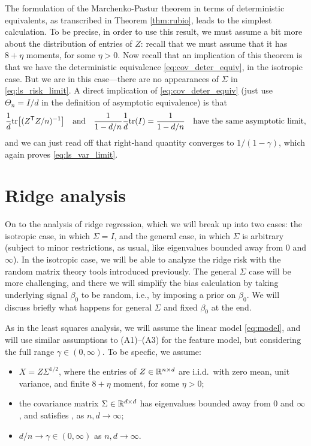 \documentclass{article}
\begin{document}
The formulation of the Marchenko-Pastur theorem in terms of deterministic
equivalents, as transcribed in Theorem \ref{thm:rubio}, leads to the simplest
calculation. To be precise, in order to use this result, we must assume a bit
more about the distribution of entries of $Z$: recall that we must assume that
it has $8+\eta$ moments, for some $\eta>0$. Now recall that an implication of
this theorem is that we have the deterministic equivalence
\eqref{eq:cov_deter_equiv}, in the isotropic case. But we are in this
case---there are no appearances of $\Sigma$ in \eqref{eq:ls_risk_limit}.  A 
direct implication of \eqref{eq:cov_deter_equiv} (just use $\Theta_n = I/d$ in
the definition of asymptotic equivalence) is that   
\[
\frac{1}{d} \mathrm{tr} \big[ (Z^{\mathsf{T}} Z/n)^{-1} \big] \quad \text{and} \quad
\frac{1}{1-d/n} \frac{1}{d} \mathrm{tr}(I) = \frac{1}{1-d/n} \quad \text{have the same 
  asymptotic limit}, 
\]
and we can just read off that right-hand quantity converges to $1/(1-\gamma)$,
which again proves \eqref{eq:ls_var_limit}.   

\section{Ridge analysis}

On to the analysis of ridge regression, which we will break up into two cases:
the isotropic case, in which $\Sigma = I$, and the general case, in which
$\Sigma$ is arbitrary (subject to minor restrictions, as usual, like eigenvalues
bounded away from $0$ and $\infty$). In the isotropic case, we will be able to
analyze the ridge risk with the random matrix theory tools introduced
previously.  The general $\Sigma $ case will be more challenging, and there we 
will simplify the bias calculation by taking underlying signal $\beta_0$ to be
random, i.e., by imposing a prior on $\beta_0$. We will discuss briefly what
happens for general $\Sigma$ and fixed $\beta_0$ at the end.          

As in the least squares analysis, we will assume the linear model
\eqref{eq:model}, and will use similar assumptions to (A1)--(A3) for the feature   
model, but considering the full range $\gamma \in (0,\infty)$. To be specfic, we
assume:    
\begin{itemize}
\item[(B1)] $X = Z \Sigma^{1/2}$, where the entries of $Z \in \mathbb{R}^{n \times d}$
  are i.i.d.\ with zero mean, unit variance, and finite $8+\eta$ moment, for
  some $\eta>0$; 
\item[(B2)] the covariance matrix $\Sigma \in \mathbb{R}^{d \times d}$ has eigenvalues
  bounded away from $0$ and $\infty$, and satisfies ,
  as $n,d \to \infty$; 
\item[(B3)] $d/n \to \gamma \in (0,\infty)$ as $n,d \to \infty$.
\end{itemize}
\end{document}
